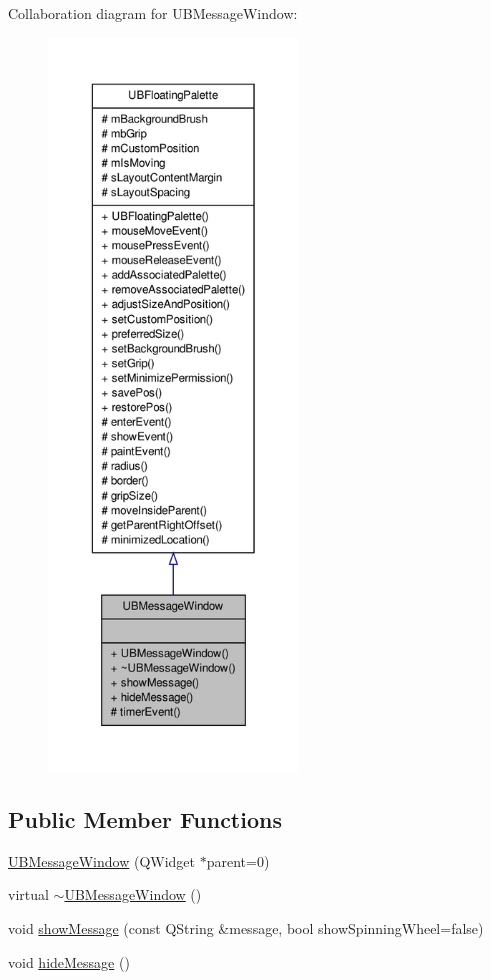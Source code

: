 Collaboration diagram for U\-B\-Message\-Window\-:
\nopagebreak
\begin{figure}[H]
\begin{center}
\leavevmode
\includegraphics[height=550pt]{dd/d95/class_u_b_message_window__coll__graph}
\end{center}
\end{figure}
\subsection*{Public Member Functions}
\begin{DoxyCompactItemize}
\item 
\hyperlink{class_u_b_message_window_a0be87bd0e3df2c788c55912b0ef5c584}{U\-B\-Message\-Window} (Q\-Widget $\ast$parent=0)
\item 
virtual \hyperlink{class_u_b_message_window_a7c09e97e3625ed93a41020219c86e1ee}{$\sim$\-U\-B\-Message\-Window} ()
\item 
void \hyperlink{class_u_b_message_window_a8c6e3ff66e94a5ff2e11ebf52d5a8b35}{show\-Message} (const Q\-String \&message, bool show\-Spinning\-Wheel=false)
\item 
void \hyperlink{class_u_b_message_window_af0f92d33532361f4048ab584621518f8}{hide\-Message} ()
\end{DoxyCompactItemize}
